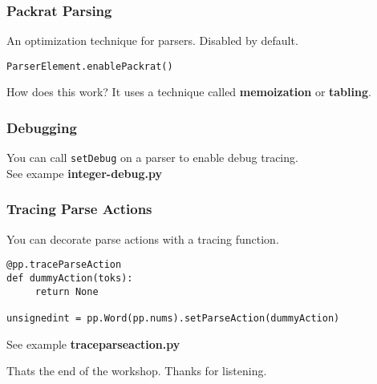\documentclass{beamer}
\begin{document}
\begin{frame}[fragile]
\frametitle{Packrat Parsing}
An optimization technique for parsers. Disabled by default.  \\
\medskip
\begin{verbatim}
ParserElement.enablePackrat()
\end{verbatim}
\medskip
How does this work? It uses a technique called \textbf{memoization} or \textbf{tabling}.
\end{frame}

\begin{frame}
\frametitle{Debugging}
You can call \texttt{setDebug} on a parser to enable debug tracing. \\
\medskip
See exampe \textbf{integer-debug.py}
\end{frame}

\begin{frame}[fragile]
\frametitle{Tracing Parse Actions}
You can decorate parse actions with a tracing function.
\begin{verbatim}
@pp.traceParseAction
def dummyAction(toks):
     return None

unsignedint = pp.Word(pp.nums).setParseAction(dummyAction)
\end{verbatim}
See example \textbf{traceparseaction.py}
\end{frame}

\begin{frame}
\begin{center}
Thats the end of the workshop. Thanks for listening.
\end{center}
\end{frame}
\end{document}
